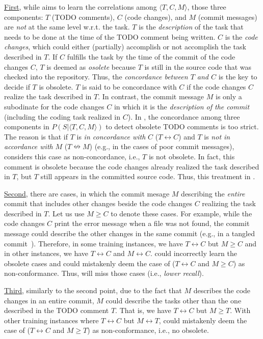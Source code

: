 \underline{First}, while \tdcleaner aims to learn the correlations
among $\langle T, C, M \rangle$, those three components: $T$ (TODO
comments), $C$ (code changes), and $M$ (commit messages) are {\em not}
at the same level w.r.t. the task. $T$ is the {\em description} of the
task that needs to be done at the time of the TODO comment being
written. $C$ is the {\em code changes}, which could either (partially)
accomplish or not accomplish the task described in $T$. If $C$
fulfills the task by the time of the commit of the code changes $C$,
$T$ is deemed as {\em osolete} because $T$ is still in the source code
that was checked into the repository. Thus, the {\em concordance
  between $T$ and $C$} is the key to decide if $T$ is obsolete. $T$ is
said to be concordance with $C$ if the code changes $C$ realize the
task described in $T$. In contrast, the commit message $M$ is only a
subodinate for the code changes $C$ in which it is the {\em
  description of the commit} (including the coding task realized in
$C$). In \tdcleaner, the concordance among three components in $P(S |
\langle T, C, M \rangle)$ to detect obsolete TODO comments is too
strict. The reason is that if $T$ is {\em in concordance with} $C$ ($T
\leftrightarrow C$) and $T$ is {\em not in accordance with} $M$ ($T
\nleftrightarrow M$) (e.g., in the cases of poor commit messages),
\tdcleaner considers this case as non-concordance, i.e., $T$ is not
obsolete. In fact, this comment is obsolete because the
code changes already realized the task described in $T$, but $T$ still
appears in the committed source code. Thus, this treatment in
.

\underline{Second}, there are cases, in which the commit mesage $M$
describing the {\em entire} commit that includes other changes beside
the code changes $C$ realizing the task described in $T$. Let us use
$M \geq C$ to denote these cases. For example, while the code changes
$C$ print the error message when a file was not found, the commit
message could describe the other changes in the same commit (e.g., in
a tangled commit~\cite{flexeme-fse20}).  Therefore, in some training
instances, we have $T \leftrightarrow C$ but $M \geq C$ and in other
instances, we have $T \leftrightarrow C$ and $M \leftrightarrow
C$. \tdcleaner could incorrectly learn the obsolete cases
and could mistakenly deem the case of ($T \leftrightarrow C$ and $M
\geq C$) as non-conformance. Thus, \tdcleaner will miss those cases
(i.e., {\em lower recall}).

\underline{Third}, similarly to the second point, due to the fact that
$M$ describes the code changes in an entire commit, $M$ could describe
the tasks other than the one described in the TODO comment $T$. That
is, we have $T \leftrightarrow C$ but $M \geq T$. With other training
instances where $T \leftrightarrow C$ but $M \leftrightarrow T$,
\tdcleaner could mistakenly deem the case of ($T \leftrightarrow C$ and
$M \geq T$) as non-conformance, i.e., no obsolete.


